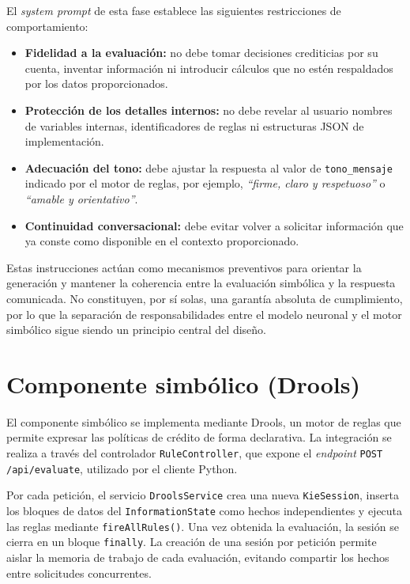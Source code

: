 \documentclass[12pt,a4paper]{report}
\begin{document}
El \textit{system prompt} de esta fase establece las siguientes restricciones de comportamiento:

\begin{itemize}
    \item \textbf{Fidelidad a la evaluación:} no debe tomar decisiones crediticias por su cuenta, inventar información ni introducir cálculos que no estén respaldados por los datos proporcionados.
    
    \item \textbf{Protección de los detalles internos:} no debe revelar al usuario nombres de variables internas, identificadores de reglas ni estructuras JSON de implementación.
    
    \item \textbf{Adecuación del tono:} debe ajustar la respuesta al valor de \texttt{tono\_mensaje} indicado por el motor de reglas, por ejemplo, \textit{``firme, claro y respetuoso''} o \textit{``amable y orientativo''}.
    
    \item \textbf{Continuidad conversacional:} debe evitar volver a solicitar información que ya conste como disponible en el contexto proporcionado.
\end{itemize}

Estas instrucciones actúan como mecanismos preventivos para orientar la generación y mantener la coherencia entre la evaluación simbólica y la respuesta comunicada. No constituyen, por sí solas, una garantía absoluta de cumplimiento, por lo que la separación de responsabilidades entre el modelo neuronal y el motor simbólico sigue siendo un principio central del diseño.


\section{Componente simbólico (Drools)}

El componente simbólico se implementa mediante Drools, un motor de reglas que permite expresar las políticas de crédito de forma declarativa. La integración se realiza a través del controlador \texttt{RuleController}, que expone el \textit{endpoint} \texttt{POST /api/evaluate}, utilizado por el cliente Python.

Por cada petición, el servicio \texttt{DroolsService} crea una nueva \texttt{KieSession}, inserta los bloques de datos del \texttt{InformationState} como hechos independientes y ejecuta las reglas mediante \texttt{fireAllRules()}. Una vez obtenida la evaluación, la sesión se cierra en un bloque \texttt{finally}. La creación de una sesión por petición permite aislar la memoria de trabajo de cada evaluación, evitando compartir los hechos entre solicitudes concurrentes.
\end{document}

